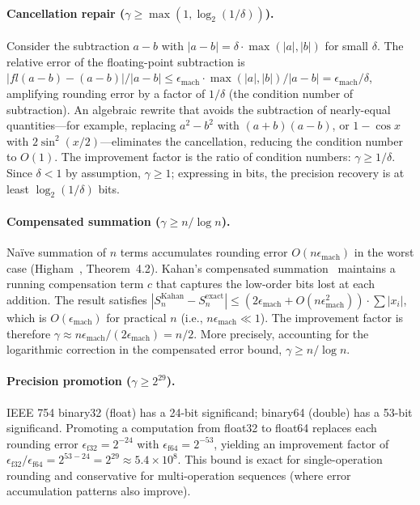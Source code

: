 \documentclass[11pt]{article}
\begin{document}
\paragraph{Cancellation repair ($\gamma \geq \max(1, \log_2(1/\delta))$).}
Consider the subtraction $a - b$ with $|a - b| = \delta \cdot \max(|a|, |b|)$ for small $\delta$. The relative error of the floating-point subtraction is $|fl(a-b) - (a-b)|/|a-b| \leq \epsilon_{\text{mach}} \cdot \max(|a|,|b|)/|a-b| = \epsilon_{\text{mach}}/\delta$, amplifying rounding error by a factor of $1/\delta$ (the condition number of subtraction). An algebraic rewrite that avoids the subtraction of nearly-equal quantities---for example, replacing $a^2 - b^2$ with $(a+b)(a-b)$, or $1 - \cos x$ with $2\sin^2(x/2)$---eliminates the cancellation, reducing the condition number to $O(1)$. The improvement factor is the ratio of condition numbers: $\gamma \geq 1/\delta$. Since $\delta < 1$ by assumption, $\gamma \geq 1$; expressing in bits, the precision recovery is at least $\log_2(1/\delta)$ bits.

\paragraph{Compensated summation ($\gamma \geq n/\log n$).}
Na\"ive summation of $n$ terms accumulates rounding error $O(n \epsilon_{\text{mach}})$ in the worst case (Higham~\cite{higham}, Theorem~4.2). Kahan's compensated summation~\cite{kahan} maintains a running compensation term $c$ that captures the low-order bits lost at each addition. The result satisfies $|S_n^{\text{Kahan}} - S_n^{\text{exact}}| \leq (2\epsilon_{\text{mach}} + O(n\epsilon_{\text{mach}}^2)) \cdot \sum|x_i|$, which is $O(\epsilon_{\text{mach}})$ for practical $n$ (i.e., $n \epsilon_{\text{mach}} \ll 1$). The improvement factor is therefore $\gamma \approx n\epsilon_{\text{mach}} / (2\epsilon_{\text{mach}}) = n/2$. More precisely, accounting for the logarithmic correction in the compensated error bound, $\gamma \geq n / \log n$.

\paragraph{Precision promotion ($\gamma \geq 2^{29}$).}
IEEE 754 binary32 (float) has a 24-bit significand; binary64 (double) has a 53-bit significand. Promoting a computation from float32 to float64 replaces each rounding error $\epsilon_{\text{f32}} = 2^{-24}$ with $\epsilon_{\text{f64}} = 2^{-53}$, yielding an improvement factor of $\epsilon_{\text{f32}} / \epsilon_{\text{f64}} = 2^{53-24} = 2^{29} \approx 5.4 \times 10^8$. This bound is exact for single-operation rounding and conservative for multi-operation sequences (where error accumulation patterns also improve).
\end{document}
